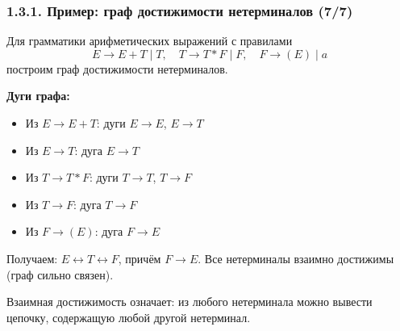 \documentclass[mathserif,12pt,aspectratio=169]{beamer}
\def\NB#1{{\bf\color{brown}#1}}
\begin{document}
\begin{frame}
\frametitle{1.3.1. Пример: граф достижимости нетерминалов (7/7)}

\begin{example}
Для грамматики арифметических выражений с правилами
\[
E \to E + T \mid T, \quad T \to T * F \mid F, \quad F \to (E) \mid a
\]
построим граф достижимости нетерминалов.

\NB{Дуги графа:}
\begin{itemize}
\item Из $E \to E + T$: дуги $E \to E$, $E \to T$
\item Из $E \to T$: дуга $E \to T$
\item Из $T \to T * F$: дуги $T \to T$, $T \to F$
\item Из $T \to F$: дуга $T \to F$
\item Из $F \to (E)$: дуга $F \to E$
\end{itemize}

Получаем: $E \leftrightarrow T \leftrightarrow F$, причём $F \to E$.
Все нетерминалы взаимно достижимы (граф сильно связен).
\end{example}

\begin{remark}
Взаимная достижимость означает: из любого нетерминала можно вывести цепочку, 
содержащую любой другой нетерминал.
\end{remark}

\end{frame}
\end{document}
